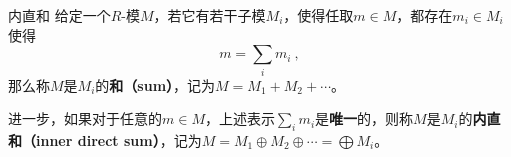 





\begin{definition}{内直和}
给定一个$R$-模$M$，若它有若干子模$M_i$，使得任取$m\in M$，都存在$m_i\in M_i$使得
\begin{equation}
m = \sum_i m_i~, 
\end{equation}
那么称$M$是$M_i$的\textbf{和（sum）}，记为$M=M_1+M_2+\cdots$。

进一步，如果对于任意的$m\in M$，上述表示$\sum_i m_i$是\textbf{唯一}的，则称$M$是$M_i$的\textbf{内直和（inner direct sum）}，记为$M=M_1\oplus M_2\oplus \cdots = \bigoplus M_i$。
\end{definition}
















